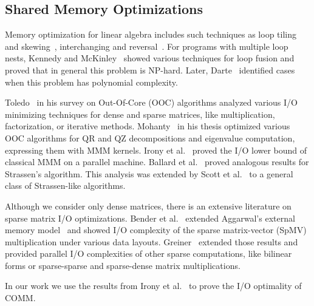 \documentclass[sigplan,review,anonymous,10pt]{acmart}\settopmatter{printfolios=true,printccs=false,printacmref=false}
\begin{document}
\subsection{Shared Memory Optimizations}
Memory optimization for linear algebra includes such techniques as loop tiling 
and skewing~\cite{tiling}, interchanging and reversal~\cite{tiling2}. For 
programs with multiple loop nests, Kennedy and McKinley~\cite{loopFusion} 
showed various techniques for loop fusion and proved that in general this 
problem is NP-hard. Later, 
Darte~\cite{loopFusionComplexity} identified cases when this problem has 
polynomial complexity.

Toledo~\cite{IOsurvey} in his survey on Out-Of-Core (OOC) algorithms analyzed 
various I/O minimizing techniques for dense and sparse matrices, like 
multiplication, factorization, or iterative methods. 
Mohanty~\cite{MohantyThesis} in his thesis optimized various OOC algorithms for 
QR and QZ decompositions and eigenvalue computation, expressing them with MMM 
kernels. Irony et 
al.~\cite{IronyMMM} proved the I/O lower bound of classical MMM on a parallel 
machine. Ballard et al.~\cite{strassenBounds} proved analogous results for 
Strassen's algorithm. This analysis was extended by Scott et 
al.~\cite{generalStrassenBounds} to a general class of Strassen-like algorithms.

Although we consider only dense matrices, there is an extensive literature on 
sparse matrix I/O optimizations. Bender et al.~\cite{SpMVIO} extended 
Aggarwal's external memory model~\cite{externalMem} and showed I/O complexity 
of the sparse matrix-vector (SpMV) multiplication under various data layouts. 
Greiner~\cite{SpEverything} extended those results and provided parallel I/O 
complexities of other sparse computations, like bilinear forms or sparse-sparse 
and sparse-dense matrix multiplications. 

In our work we use the results from Irony et 
al.~\cite{IronyMMM} to prove the I/O optimality of COMM.
\end{document}
